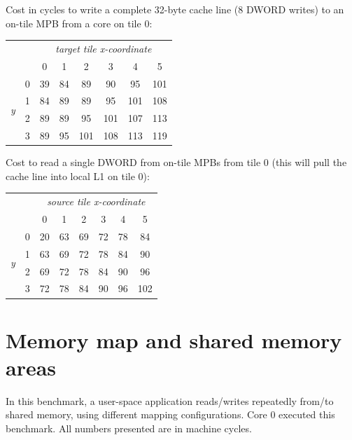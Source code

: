 \documentclass[a4paper,twoside]{report} %
\begin{document}
Cost in cycles to write a complete 32-byte cache line (8 DWORD writes)
to an on-tile MPB from a core on tile 0:

\begin{center}
\begin{tabular}{cc|cccccc}
&  &\multicolumn{6}{c}{\textit{target tile x-coordinate}} \\
 &   & 0   & 1   & 2   & 3   & 4   & 5 \\ \hline 
\multirow{4}{*}{\textit{y}} & 0 & 39  & 84  & 89  & 90  & 95  & 101 \\
 & 1 & 84  & 89  & 89  & 95  & 101 & 108 \\
 & 2 & 89  & 89  & 95 & 101 & 107 & 113 \\
 & 3 & 89  & 95  & 101 & 108 & 113 & 119 \\
\end{tabular}
\end{center}

Cost to read a single DWORD from on-tile MPBs from tile 0 (this will
pull the cache line into local L1 on tile 0):

\begin{center}
\begin{tabular}{cc|cccccc}
&  &\multicolumn{6}{c}{\textit{source tile x-coordinate}} \\
 &   & 0   & 1   & 2   & 3   & 4   & 5 \\ \hline 
\multirow{4}{*}{\textit{y}} & 0 & 20  & 63  & 69  & 72  & 78  & 84 \\
 & 1 & 63  & 69  & 72  & 78  & 84  & 90 \\
 & 2 & 69  & 72  & 78  & 84  & 90  & 96 \\
 & 3 & 72  & 78  & 84  & 90  & 96  & 102 \\
\end{tabular}
\end{center}

\section{Memory map and shared memory areas}

In this benchmark, a user-space application reads/writes repeatedly
from/to shared memory, using different mapping configurations. Core 0
executed this benchmark. All numbers presented are in machine cycles.
\end{document}
